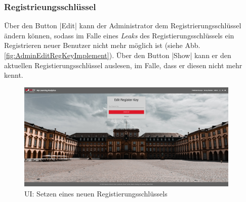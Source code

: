 \subsubsection*{Registrieungsschlüssel \faKey}

Über den Button \jinline|Edit| kann der Administrator dem Registrierungsschlüssel ändern können, sodass im Falle eines \emph{Leaks} des Registierungsschlüssels ein Registrieren neuer Benutzer nicht mehr möglich ist (siehe Abb. \vref{fig:AdminEditRegKeyImplement}). 
Über den Button \jinline|Show|\xspace kann er den aktuellen Registierungsschlüssel auslesen, im Falle, dass er diesen nicht mehr kennt. 

\begin{figure}[hp]
	\centering
	\includegraphics[width=0.95\textwidth, keepaspectratio]{img/client/EditSurveyMasterKey.png}
	\captionsetup{justification=centering, format=plain}
	\caption[\acf{UI}: Setzen eines neuen Registierungsschlüssels]{\acf{UI}: Setzen eines neuen Registierungsschlüssels \\ \quelleScreenshot}
	\label{fig:AdminEditRegKeyImplement}
\end{figure}